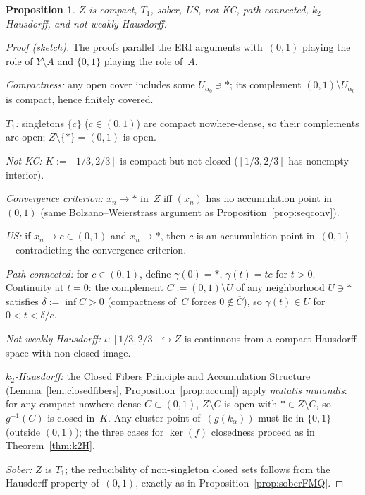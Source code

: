 \documentclass[11pt]{article}
\newtheorem{proposition}[theorem]{Proposition}
\theoremstyle{definition}
\theoremstyle{remark}
\begin{document}
\begin{proposition}\label{prop:onepoint}
$Z$ is compact, $T_1$, sober, US, not KC, path-connected,
$k_2$-Hausdorff, and not weakly Hausdorff.
\end{proposition}

\begin{proof}[Proof \textup{(sketch)}]
The proofs parallel the ERI arguments with~$(0,1)$ playing the role
of $Y \setminus A$ and $\{0,1\}$ playing the role of~$A$.

\emph{Compactness:}
any open cover includes some $U_{\alpha_0} \ni \ast$; its complement
$(0,1) \setminus U_{\alpha_0}$ is compact, hence finitely covered.

\emph{$T_1$:} singletons $\{c\}$ ($c \in (0,1)$) are compact
nowhere-dense, so their complements are open; $Z \setminus \{\ast\}
= (0,1)$ is open.

\emph{Not KC:}
$K := [1/3, 2/3]$ is compact but not closed ($[1/3,2/3]$ has
nonempty interior).

\emph{Convergence criterion:}
$x_n \to \ast$ in~$Z$ iff $(x_n)$ has no accumulation point
in~$(0,1)$ (same Bolzano--Weierstrass argument as
Proposition~\ref{prop:seqconv}).

\emph{US:}
if $x_n \to c \in (0,1)$ and $x_n \to \ast$, then $c$ is an
accumulation point in~$(0,1)$---contradicting the convergence
criterion.

\emph{Path-connected:}
for $c \in (0,1)$, define $\gamma(0) = \ast$, $\gamma(t) = tc$ for
$t > 0$.
Continuity at $t=0$: the complement $C := (0,1) \setminus U$ of any
neighborhood $U \ni \ast$ satisfies $\delta := \inf C > 0$
(compactness of~$C$ forces $0 \notin \overline{C}$), so
$\gamma(t) \in U$ for $0 < t < \delta/c$.

\emph{Not weakly Hausdorff:}
$\iota\colon [1/3, 2/3] \hookrightarrow Z$ is continuous from a
compact Hausdorff space with non-closed image.

\emph{$k_2$-Hausdorff:}
the Closed Fibers Principle and Accumulation Structure
(Lemma~\ref{lem:closedfibers}, Proposition~\ref{prop:accum}) apply
\emph{mutatis mutandis}: for any compact nowhere-dense
$C \subset (0,1)$, $Z \setminus C$ is open with $\ast \in
Z \setminus C$, so $g^{-1}(C)$ is closed in~$K$.
Any cluster point of~$(g(k_\alpha))$ must lie in $\{0,1\}$ (outside
$(0,1)$); the three cases for $\ker(f)$ closedness proceed as in
Theorem~\ref{thm:k2H}.

\emph{Sober:}
$Z$ is $T_1$; the reducibility of non-singleton closed sets follows
from the Hausdorff property of~$(0,1)$, exactly as in
Proposition~\ref{prop:soberFMQ}.
\end{proof}
\end{document}

